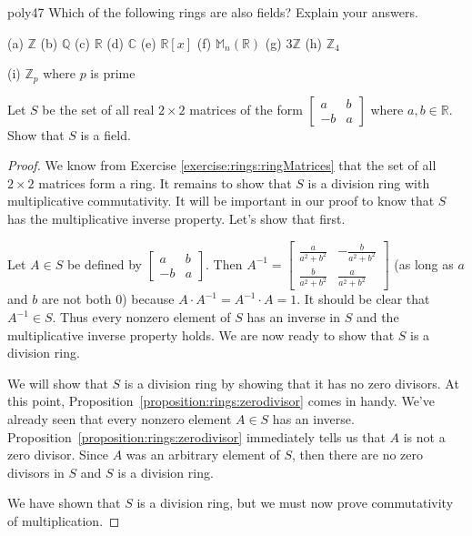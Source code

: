 \begin{exercise}{poly47}
Which of the following rings are also fields?  Explain your answers.

(a) ${\mathbb Z}$\quad
(b) ${\mathbb Q}$\quad
(c) ${\mathbb R}$\quad
(d) ${\mathbb C}$\quad
(e) ${\mathbb R}[x]$\quad  
(f) ${\mathbb M}_n({\mathbb R})$\quad
(g) $3{\mathbb Z}$\quad
(h) ${\mathbb Z}_4$\quad

(i) ${\mathbb Z}_p$ where $p$ is prime
\end{exercise}

\begin{example}{}
Let $S$ be the set of all real $2\times 2$ matrices of the form $\begin{bmatrix}
a & b\\
-b & a 
\end{bmatrix}$
where $a,b\in{\mathbb R}$.  Show that $S$ is a field.

\begin{proof}
We know from Exercise \ref{exercise:rings:ringMatrices} that the set of all $2\times 2$ matrices form a ring.  It remains to show that $S$ is a division ring with multiplicative commutativity.  It will be important in our proof to know that $S$ has the multiplicative inverse property.  Let's show that first.

Let $A\in S$ be defined by
$\begin{bmatrix}
a & b\\
-b & a
\end{bmatrix}.$
Then $A^{-1}=
\begin{bmatrix}
\frac{a}{a^2+b^2} & -\frac{b}{a^2+b^2}\\
\frac{b}{a^2+b^2} & \frac{a}{a^2+b^2}
\end{bmatrix}$ (as long as $a$ and $b$ are not both 0)
because $A\cdot A^{-1}=A^{-1}\cdot A=1$.  It should be clear that $A^{-1}\in S$.  Thus every nonzero element of $S$ has an inverse in $S$ and the multiplicative inverse property holds.  We are now ready to show that $S$ is a division ring.

We will show that $S$ is a division ring by showing that it has no zero divisors.  At this point, Proposition~\ref{proposition:rings:zerodivisor} comes in handy.  We've already seen that every nonzero element  $A \in S$ has an inverse. Proposition~\ref{proposition:rings:zerodivisor} immediately tells us that $A$ is not a zero divisor. Since $A$ was an arbitrary element of $S$, then there are no zero divisors in $S$ and $S$ is a division ring.
  
We have shown that $S$ is a division ring, but we must now prove commutativity of multiplication.


\end{proof}
\end{example}
